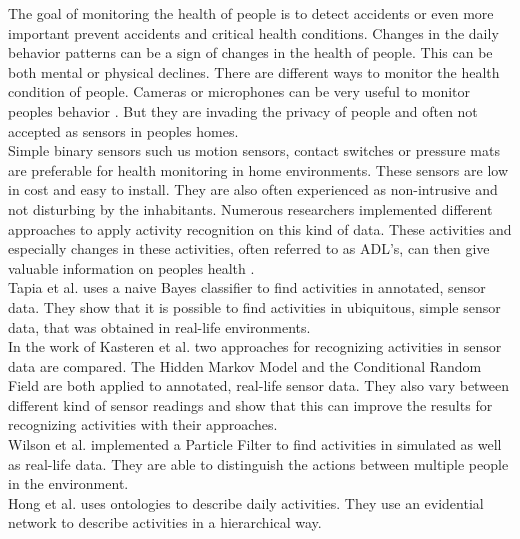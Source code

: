 The goal of monitoring the health of people is to detect accidents or even more important prevent accidents and critical health conditions. Changes in the daily behavior patterns can be a sign of changes in the health of people. This can be both mental or physical declines.
There are different ways to monitor the health condition of people. Cameras or microphones can be very useful to monitor peoples behavior \cite{Nagai2010204, Wu_2003_4676}. But they are invading the privacy of people and often not accepted as sensors in peoples homes.\\

Simple binary sensors such us motion sensors, contact switches or pressure mats are preferable for health monitoring in home environments. These sensors are low in cost and easy to install. They are also often experienced as non-intrusive and not disturbing by the inhabitants. Numerous researchers implemented different approaches to apply activity recognition on this kind of data. These activities and especially changes in these activities, often referred to as ADL's, can then give valuable information on peoples health \cite{journals/hf/RogersMWF98}.\\
Tapia et al. \cite{Tapia04activityrecognition} uses a naive Bayes classifier to find activities in annotated, sensor data. They show that it is possible to find activities in ubiquitous, simple sensor data, that was obtained in real-life environments.\\
In the work of Kasteren et al. \cite{} two approaches for recognizing activities in sensor data are compared. The Hidden Markov Model and the Conditional Random Field are both applied to annotated, real-life sensor data. They also vary between different kind of sensor readings and show that this can improve the results for recognizing activities with their approaches.\\
Wilson et al. \cite{Wilson:2005:STA:2154273.2154280} implemented a Particle Filter to find activities in simulated as well as real-life data. They are able to distinguish the actions between multiple people in the environment.\\
Hong et al. \cite{Hong2009236} uses ontologies to describe daily activities. They use an evidential network to describe activities in a hierarchical way.
\\



